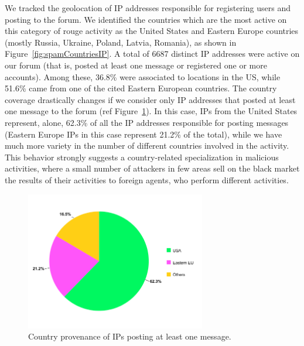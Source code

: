 We tracked the geolocation of IP addresses responsible for registering users and posting to the forum. We identified the countries which are the most active on this category of rouge activity as the United States and Eastern Europe countries (mostly Russia, Ukraine, Poland, Latvia, Romania), as shown in Figure~\ref{fig:spamCountriesIP}. A total of 6687 distinct IP addresses were active on our forum (that is, posted at least one message or registered one or more accounts). Among these, 36.8\% were associated to locations in the US, while 51.6\% came from one of the cited Eastern European countries. The country coverage drastically changes if we consider only IP addresses that posted at least one message to the forum (ref Figure~\ref{fig:spamCountriesMessage}). In this case, IPs from the United States represent, alone, 62.3\% of all the IP addresses responsible for posting messages (Eastern Europe IPs in this case represent 21.2\% of the total), while we have much more variety in the number of different countries involved in the activity. This behavior strongly suggests a country-related specialization in malicious activities, where a small number of attackers in few areas sell on the black market the results of their activities to foreign agents, who perform different activities.

\begin{figure}[tbh]
\centerline{\includegraphics[width=0.7\textwidth]{Images/spamCountriesMessage.png}}
\caption{Country provenance of IPs posting at least one message.\label{fig:spamCountriesMessage}}
\end{figure}

